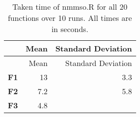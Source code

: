 \documentclass[12pt,a4paper]{article}
\begin{document}
\begin{longtable}[c]{@{}crr@{}}
\caption{Taken time of nmmso.R for all 20 functions over 10 runs. All
times are in seconds.}\tabularnewline
\toprule
\begin{minipage}[b]{0.13\columnwidth}\centering\strut
~
\strut\end{minipage} &
\begin{minipage}[b]{0.09\columnwidth}\raggedleft\strut
Mean
\strut\end{minipage} &
\begin{minipage}[b]{0.25\columnwidth}\raggedleft\strut
Standard Deviation
\strut\end{minipage}\tabularnewline
\midrule
\endfirsthead
\toprule
\begin{minipage}[b]{0.13\columnwidth}\centering\strut
~
\strut\end{minipage} &
\begin{minipage}[b]{0.09\columnwidth}\raggedleft\strut
Mean
\strut\end{minipage} &
\begin{minipage}[b]{0.25\columnwidth}\raggedleft\strut
Standard Deviation
\strut\end{minipage}\tabularnewline
\midrule
\endhead
\begin{minipage}[t]{0.13\columnwidth}\centering\strut
\textbf{F1}
\strut\end{minipage} &
\begin{minipage}[t]{0.09\columnwidth}\raggedleft\strut
13
\strut\end{minipage} &
\begin{minipage}[t]{0.25\columnwidth}\raggedleft\strut
3.3
\strut\end{minipage}\tabularnewline
\begin{minipage}[t]{0.13\columnwidth}\centering\strut
\textbf{F2}
\strut\end{minipage} &
\begin{minipage}[t]{0.09\columnwidth}\raggedleft\strut
7.2
\strut\end{minipage} &
\begin{minipage}[t]{0.25\columnwidth}\raggedleft\strut
5.8
\strut\end{minipage}\tabularnewline
\begin{minipage}[t]{0.13\columnwidth}\centering\strut
\textbf{F3}
\strut\end{minipage} &
\begin{minipage}[t]{0.09\columnwidth}\raggedleft\strut
4.8
\strut\end{minipage} &

\end{longtable}
\end{document}
